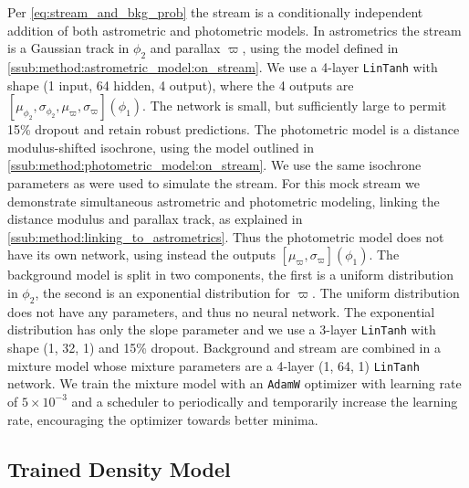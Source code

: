 \documentclass[twocolumn]{aastex631}
\begin{document}
        Per \autoref{eq:stream_and_bkg_prob} the stream is a conditionally independent
        addition of both astrometric and photometric models.
        In astrometrics the stream is a Gaussian track in $\phi_2$ and
        parallax $\varpi$, using the model defined in
        \autoref{ssub:method:astrometric_model:on_stream}. We use a 4-layer 
        \texttt{LinTanh} with shape (1 input, 64 hidden, 4 output), where the 4 outputs
        are $[\mu_{\phi_2}, \sigma_{\phi_2}, \mu_{\varpi}, \sigma_{\varpi}](\phi_1)$.
        The network is small, but sufficiently large to permit 15\% dropout and retain
        robust predictions.
        The photometric model is a distance modulus-shifted isochrone, using the model
        outlined in  \autoref{ssub:method:photometric_model:on_stream}. We use the
        same isochrone parameters as were used to simulate the stream. For this mock
        stream we demonstrate simultaneous astrometric and photometric modeling, linking
        the distance modulus and parallax track, as explained in
        \autoref{ssub:method:linking_to_astrometrics}. Thus the photometric model
        does not have its own network, using instead the outputs
        $[\mu_{\varpi}, \sigma_{\varpi}](\phi_1)$.
        The background model is split in two components, the first is a uniform distribution
        in $\phi_2$, the second is an exponential distribution for $\varpi$.
        The uniform distribution does not have any parameters, and thus no neural network.
        The exponential distribution has only the slope parameter and we use a 3-layer 
        \texttt{LinTanh} with shape (1, 32, 1) and 15\% dropout. Background and
        stream are combined in a mixture model whose mixture parameters are a 4-layer 
        (1, 64, 1) \texttt{LinTanh} network. We train the mixture model with an
        \texttt{AdamW} optimizer with learning rate of $5\times10^{-3}$ and a scheduler
        to periodically and temporarily increase the learning rate, encouraging the optimizer
        towards better minima.

    \subsection{Trained Density Model} \label{sub:results_mock:results}
\end{document}
